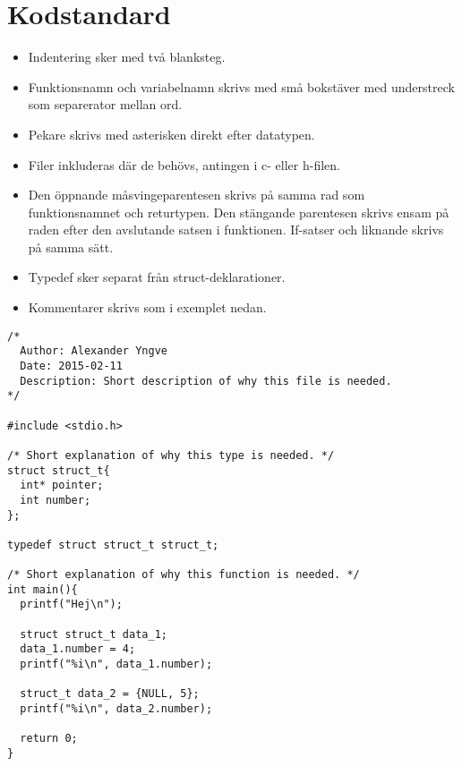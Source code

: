 
\section{Kodstandard}

\begin{itemize}
  \item Indentering sker med två blanksteg.
  \item Funktionsnamn och variabelnamn skrivs med små bokstäver med understreck som separerator mellan ord.
  \item Pekare skrivs med asterisken direkt efter datatypen.
  \item Filer inkluderas där de behövs, antingen i c- eller h-filen.
  \item Den öppnande måsvingeparentesen skrivs på samma rad som funktionsnamnet och returtypen. Den stängande parentesen skrivs ensam på raden efter den avslutande satsen i funktionen. If-satser och liknande skrivs på samma sätt.
  \item Typedef sker separat från struct-deklarationer.
  \item Kommentarer skrivs som i exemplet nedan.
\end{itemize}

\begin{lstlisting}
/*
  Author: Alexander Yngve
  Date: 2015-02-11
  Description: Short description of why this file is needed.
*/

#include <stdio.h>

/* Short explanation of why this type is needed. */
struct struct_t{
  int* pointer;
  int number;
};

typedef struct struct_t struct_t;

/* Short explanation of why this function is needed. */
int main(){
  printf("Hej\n");

  struct struct_t data_1;
  data_1.number = 4;
  printf("%i\n", data_1.number);

  struct_t data_2 = {NULL, 5};
  printf("%i\n", data_2.number);

  return 0;
}
\end{lstlisting}
